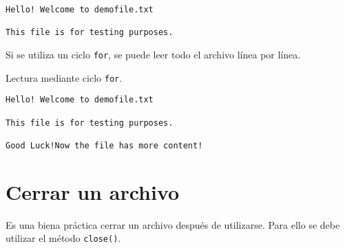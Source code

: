 \begin{verbatim}
Hello! Welcome to demofile.txt

This file is for testing purposes.

\end{verbatim}

Si se utiliza un ciclo \texttt{for}, se puede leer todo el archivo línea por línea.
\\

\begin{code} Lectura mediante ciclo \texttt{for}.
\begin{Shaded}
\begin{Highlighting}[]
\OperatorTok{=} \NormalTok{(}\NormalTok{, }\NormalTok{)}
\end{Highlighting}
\end{Shaded}

\begin{verbatim}
Hello! Welcome to demofile.txt

This file is for testing purposes.

Good Luck!Now the file has more content!
\end{verbatim}
\end{code}

\section{Cerrar un archivo}

Es una biena práctica cerrar un archivo después de utilizarse. Para ello
se debe utilizar el método \texttt{close()}.\\

